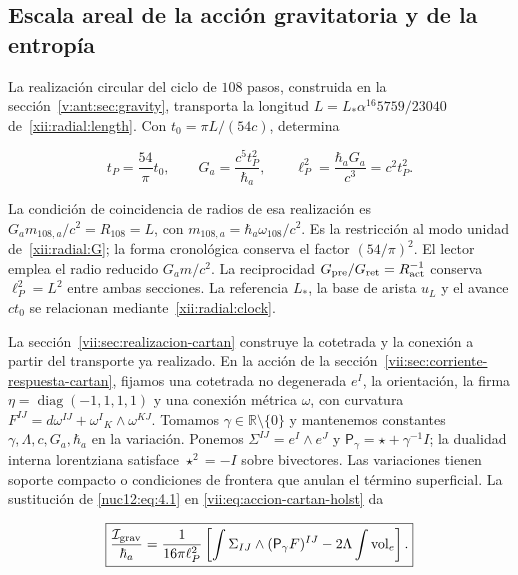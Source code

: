 \subsection{Escala areal de la acción gravitatoria y de la entropía}

La realización circular del ciclo de \(108\) pasos, construida en la sección~\ref{v:ant:sec:gravity}, transporta la longitud \(L=L_*\alpha^{16}5759/23040\) de~\eqref{xii:radial:length}. Con \(t_0=\pi L/(54c)\), determina



\begin{equation}
t_P=\frac{54}{\pi}t_0,\qquad
G_a=\frac{c^5t_P^2}{\hbar_a},\qquad
\ell_P^2=\frac{\hbar_aG_a}{c^3}=c^2t_P^2.
\label{nuc12:eq:4.1}
\end{equation}



La condición de coincidencia de radios de esa realización es \(G_a m_{108,a}/c^2=R_{108}=L\), con \(m_{108,a}=\hbar_a\omega_{108}/c^2\). Es la restricción al modo unidad de~\eqref{xii:radial:G}; la forma cronológica conserva el factor \((54/\pi)^2\). El lector emplea el radio reducido \(G_a m/c^2\). La reciprocidad \(G_{\rm pre}/G_{\rm ret}=R_{\rm act}^{-1}\) conserva \(\ell_P^2=L^2\) entre ambas secciones. La referencia \(L_*\), la base de arista \(u_L\) y el avance \(ct_0\) se relacionan mediante~\eqref{xii:radial:clock}.

La sección~\ref{vii:sec:realizacion-cartan} construye la cotetrada y la conexión a partir del transporte ya realizado. En la acción de la sección~\ref{vii:sec:corriente-respuesta-cartan}, fijamos una cotetrada no degenerada \(e^I\), la orientación, la firma \(\eta=\operatorname{diag}(-1,1,1,1)\) y una conexión métrica \(\omega\), con curvatura \(F^{IJ}=d\omega^{IJ}+\omega^I{}_{K}\wedge\omega^{KJ}\). Tomamos \(\gamma\in\mathbb R\setminus\{0\}\) y mantenemos constantes \(\gamma,\Lambda,c,G_a,\hbar_a\) en la variación. Ponemos \(\Sigma^{IJ}=e^I\wedge e^J\) y \(\mathsf P_\gamma=\star+\gamma^{-1}I\); la dualidad interna lorentziana satisface \(\star^2=-I\) sobre bivectores. Las variaciones tienen soporte compacto o condiciones de frontera que anulan el término superficial. La sustitución de \eqref{nuc12:eq:4.1} en \eqref{vii:eq:accion-cartan-holst} da



\begin{equation}
\boxed{\frac{\mathcal I_{\rm grav}}{\hbar_a}
=\frac1{16\pi\ell_P^2}
\left[\int\Sigma_{IJ}\wedge(\mathsf P_\gamma F)^{IJ}
-2\Lambda\int\operatorname{vol}_e\right].}
\label{nuc12:eq:4.2}
\end{equation}



